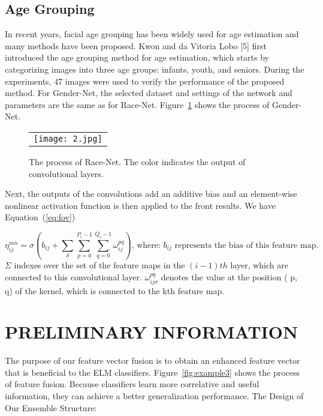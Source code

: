 \documentclass[12pt]{spieman}
\begin{document}
\begin{spacing}{2}
\subsection{Age Grouping }
In recent years, facial age grouping has been widely used for age estimation and many methods have been proposed. Kwon and da Vitoria Lobo [5] first introduced the age grouping method for age estimation, which starts by categorizing images into three age groups: infants, youth, and seniors. During the experiments, 47 images were used to verify the performance of the proposed method.
For Gender-Net, the selected dataset and settings of the network and parameters are the same as for Race-Net. Figure~\ref{fig:example2} shows the process of Gender-Net.

\begin{figure}
\begin{center}
\begin{tabular}{c}
\texttt{[image: 2.jpg]}
\end{tabular}
\end{center}
\caption 
{ \label{fig:example2}
The process of Race-Net. The color indicates the output of convolutional layers. } 
\end{figure} 

Next, the outputs of the convolutions add an additive bias and an element-wise nonlinear activation function is then applied to the front results. We have Equation~(\ref{eq:fov})

\begin{equation}
\label{eq:fov}
\eta_{ij}^{mn} =\sigma\left(b_{ij}+\sum_{\delta}\sum_{p=0}^{P_{i}-1}\sum_{q=0}^{Q_{i}-1}\omega_{ij}^{pq}\right) \text{, where: $b_{ij}$ represents the bias of this feature map.}
\end{equation}
$\Sigma$ indexes over the set of the feature maps in the $(i - 1)th$ layer, which are connected to this convolutional layer. $\omega_{ij\sigma}^{pq}$ denotes the value at the position ( p, q) of the kernel, which is connected to the kth feature map.

\section{PRELIMINARY INFORMATION}
\label{sect:sections}
The purpose of our feature vector fusion is to obtain an enhanced feature vector that is beneficial to the ELM classifiers. Figure~\ref{fig:example3} shows the process of feature fusion. Because classifiers learn more correlative and useful information, they can achieve a better generalization performance.
The Design of Our Ensemble Structure:


\end{spacing}
\end{document}
